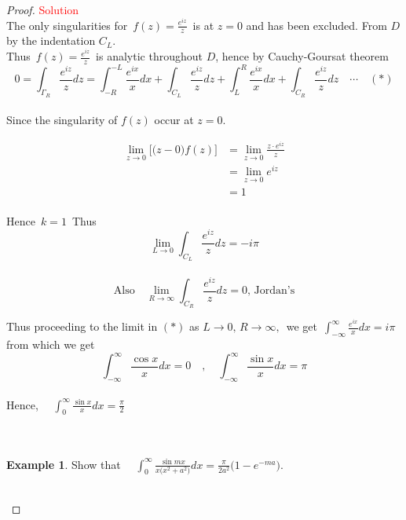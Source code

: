 \documentclass[11pt,a4paper]{article}
\theoremstyle{definition}
\newtheorem{example}[thm]{Example}
\begin{document}
\begin{proof}
\textcolor{red}{Solution}\\
The only singularities for $\, f(z) = \frac{e^{iz}}{z}\,$ is at $z = 0$ and has been excluded. From $D$ by the indentation $C_L$.\\

Thus $\, f(z) = \frac{e^{iz}}{z}\,$ is analytic throughout $D$, hence by Cauchy-Goursat theorem\\

$$0 = \int_{\Gamma_R}\frac{e^{iz}}{z}dz  = \int^{-L}_{-R}\frac{e^{ix}}{x}dx + \int_{C_L}\frac{e^{iz}}{z}dz + \int^R_L\frac{e^{ix}}{x}dx + \int_{C_R}\frac{e^{iz}}{z}dz\quad \cdots\quad  (*)$$\\


Since the singularity of $f(z)$ occur at $z  = 0$.

\begin{align*}
\lim\limits_{z\longrightarrow 0}\big[\big(z - 0\big)f(z)\big] & = \lim\limits_{z\longrightarrow 0}\frac{z \cdot e^{iz}}{z}\\
& = \lim\limits_{z\longrightarrow 0} e^{iz}\\
& = 1\\
\end{align*}

Hence $\, k = 1\,$ Thus 
$$\lim\limits_{L\longrightarrow 0} \int_{C_L}\frac{e^{iz}}{z}dz = -i\pi$$\\

$$\text{Also}\quad  \lim\limits_{R\longrightarrow \infty}\int_{C_R} \frac{e^{iz}}{z}dz = 0,\,\text{Jordan's}$$

Thus proceeding to the limit in $(*)$ as $L\longrightarrow 0,\, R\longrightarrow \infty,\,$ we get $\,\displaystyle{\int^{\infty}_{-\infty}\frac{e^{ix}}{x}dx = i\pi\,}$ from which we get 
$$\int^{\infty}_{-\infty} \frac{\cos x }{x}dx = 0\quad  , \quad  \int^{\infty}_{-\infty} \frac{\sin x}{x}dx = \pi$$\\

Hence, $\quad \displaystyle{\int^{\infty}_0 \frac{\sin x}{x}dx = \frac{\pi}{2}}$\\\\\\






\begin{example}
Show that $\quad  \displaystyle{\int^{\infty}_0 \frac{\sin mx }{x \big(x^2 + a^2\big)}dx = \frac{\pi}{2a^2}\Big(1 - e^{-ma}\Big)}$.\\\\




\end{example}
\end{proof}
\end{document}
